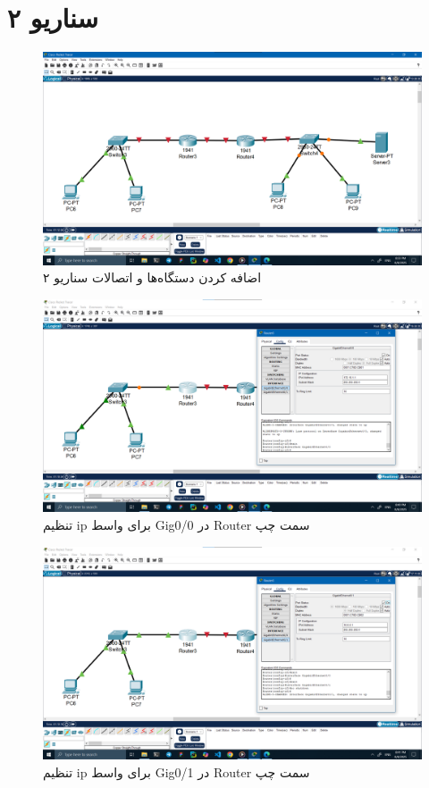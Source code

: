 \documentclass[12pt]{article}
\begin{document}
	\section{سناریو ۲}
	\begin{figure}[H]
		\centering
		\includegraphics[width=\textwidth]{resources/scenario2-1.png}
		\caption{اضافه کردن دستگاه‌ها و اتصالات سناریو ۲}
		\label{2:1}
	\end{figure}
	\begin{figure}[H]
		\centering
		\includegraphics[width=\textwidth]{resources/scenario2-2.png}
		\caption{تنظیم \textenglish{ip} برای واسط \textenglish{Gig0/0} در \textenglish{Router} سمت چپ}
		\label{2:2}
	\end{figure}
	\begin{figure}[H]
		\centering
		\includegraphics[width=\textwidth]{resources/scenario2-3.png}
		\caption{تنظیم \textenglish{ip} برای واسط \textenglish{Gig0/1} در \textenglish{Router} سمت چپ}
		\label{2:3}
	\end{figure}
\end{document}
